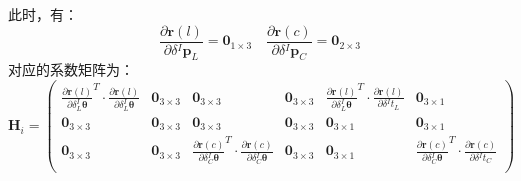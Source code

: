 此时，有：
\begin{equation}
  \frac{\partial \boldsymbol{r}(l)}{\partial \delta {^{I}\boldsymbol{p}_L}}=\boldsymbol{0}_{1\times 3}
  \quad
  \frac{\partial \boldsymbol{r}(c)}{\partial \delta {^{I}\boldsymbol{p}_C}}=\boldsymbol{0}_{2\times 3}
\end{equation}
对应的系数矩阵为：
\begin{equation*}
  \boldsymbol{H}_i=\begin{pmatrix}
    \frac{\partial \boldsymbol{r}(l)}{\partial \delta {^{I}_{L}\boldsymbol{\theta}}}^T
    \cdot \frac{\partial \boldsymbol{r}(l)}{\partial \delta {^{I}_{L}\boldsymbol{\theta}}} &
    \boldsymbol{0}_{3\times 3}                                                             &
    \boldsymbol{0}_{3\times 3}                                                             &
    \boldsymbol{0}_{3\times 3}                                                             &
    \frac{\partial \boldsymbol{r}(l)}{\partial \delta {^{I}_{L}\boldsymbol{\theta}}}^T
    \cdot \frac{\partial \boldsymbol{r}(l)}{\partial \delta {^{I}t_{L}}}                   &
    \boldsymbol{0}_{3\times 1}                                                               \\
    \boldsymbol{0}_{3\times 3}                                                             &
    \boldsymbol{0}_{3\times 3}                                                             &
    \boldsymbol{0}_{3\times 3}                                                             &
    \boldsymbol{0}_{3\times 3}                                                             &
    \boldsymbol{0}_{3\times 1}                                                             &
    \boldsymbol{0}_{3\times 1}                                                               \\
    \boldsymbol{0}_{3\times 3}                                                             &
    \boldsymbol{0}_{3\times 3}                                                             &
    \frac{\partial \boldsymbol{r}(c)}{\partial \delta {^{I}_{C}\boldsymbol{\theta}}}^T
    \cdot \frac{\partial \boldsymbol{r}(c)}{\partial \delta {^{I}_{C}\boldsymbol{\theta}}} &
    \boldsymbol{0}_{3\times 3}                                                             &
    \boldsymbol{0}_{3\times 1}                                                             &
    \frac{\partial \boldsymbol{r}(c)}{\partial \delta {^{I}_{C}\boldsymbol{\theta}}}^T
    \cdot \frac{\partial \boldsymbol{r}(c)}{\partial \delta {^{I}t_{C}}}                     \\

\end{pmatrix}
\end{equation*}
